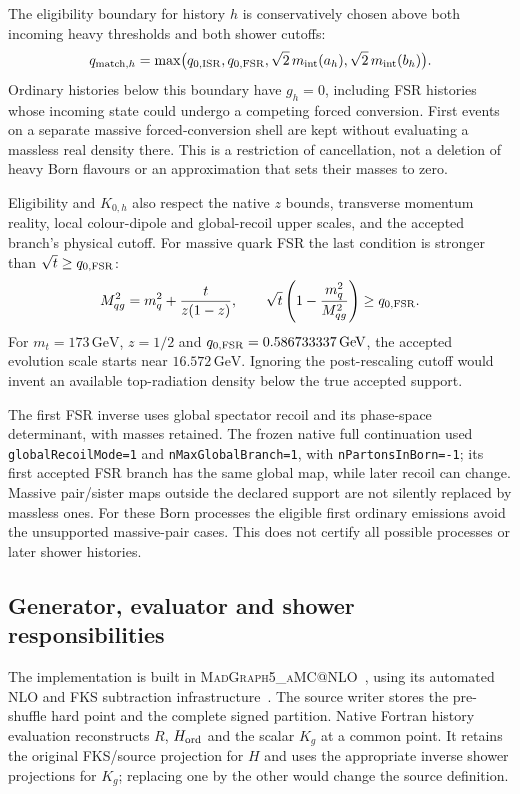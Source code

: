 \documentclass[11pt,a4paper]{article}
\makeatletter
\newcommand{\mg}{\textsc{MadGraph5\_aMC@NLO}}
\newcommand{\GeV}{\,\mathrm{GeV}}
\newcommand{\code}[1]{\texttt{\small #1}}
\makeatother
\begin{document}
The eligibility boundary for history $h$ is conservatively chosen above
both incoming heavy thresholds and both shower cutoffs:
\begin{equation}
 q_{{\rm match},h}=\max\bigl(q_{0,\rm ISR},q_{0,\rm FSR},
          \sqrt2\,m_{\rm int}(a_h),\sqrt2\,m_{\rm int}(b_h)\bigr).
 \label{eq:gate}
\end{equation}
Ordinary histories below this boundary have $g_h=0$, including FSR
histories whose incoming state could undergo a competing forced
conversion. First events on a separate massive forced-conversion shell
are kept without evaluating a massless real density there. This is a
restriction of cancellation, not a deletion of heavy Born flavours or
an approximation that sets their masses to zero.

Eligibility and $K_{0,h}$ also respect the native $z$ bounds, transverse
momentum reality, local colour-dipole and global-recoil upper scales,
and the accepted branch's physical cutoff. For massive quark FSR the
last condition is stronger than $\sqrt t\ge q_{0,\rm FSR}$:
\begin{equation}
 M_{qg}^2=m_q^2+\frac{t}{z(1-z)},\qquad
 \sqrt t\left(1-\frac{m_q^2}{M_{qg}^2}\right)
                       \ge q_{0,\rm FSR}.
 \label{eq:fsrcut}
\end{equation}
For $m_t=173\GeV$, $z=1/2$ and
$q_{0,\rm FSR}=0.586733337\GeV$, the accepted evolution scale starts near
$16.572\GeV$. Ignoring the post-rescaling cutoff would invent an
available top-radiation density below the true accepted support.

The first FSR inverse uses global spectator recoil and its phase-space
determinant, with masses retained. The frozen native full continuation used
\code{globalRecoilMode=1} and \code{nMaxGlobalBranch=1}, with
\code{nPartonsInBorn=-1}; its first accepted FSR branch has the same
global map, while later recoil can change. Massive pair/sister maps
outside the declared support are not silently replaced by massless
ones. For these Born processes the eligible first ordinary emissions
avoid the unsupported massive-pair cases. This does not certify all
possible processes or later shower histories.

\subsection{Generator, evaluator and shower responsibilities}
The implementation is built in \mg{}~\cite{Alwall}, using its
automated NLO and FKS subtraction infrastructure~\cite{FKS}.
The source writer stores the pre-shuffle hard
point and the complete signed partition. Native Fortran history
evaluation reconstructs $R$, $H_{\rm ord}$ and the scalar $K_g$ at a
common point. It retains the original FKS/source projection for $H$ and
uses the appropriate inverse shower projections for $K_g$; replacing
one by the other would change the source definition.
\end{document}
